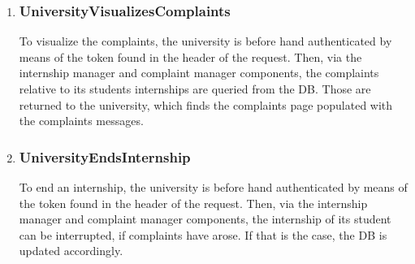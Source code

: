 \begin{enumerate}[label=\textbf{RV\arabic* -}]
\item \subsubsection{UniversityVisualizesComplaints}

To visualize the complaints, the university is before hand authenticated by means of the token found in the header of the request.
Then, via the internship manager and complaint manager components, the complaints relative to its students internships are queried from the DB.
Those are returned to the university, which finds the complaints page populated with the complaints messages.

\begin{figure}[H]
    \centering
\end{figure}

\item \subsubsection{UniversityEndsInternship}

To end an internship, the university is before hand authenticated by means of the token found in the header of the request.
Then, via the internship manager and complaint manager components, the internship of its student can be interrupted, if complaints have arose.
If that is the case, the DB is updated accordingly.

\begin{figure}[H]
    \centering
\end{figure}


\end{enumerate}
